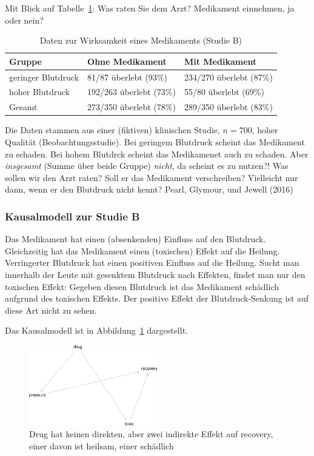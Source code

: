 \documentclass[
  a4paper,
  DIV=11]{scrreprt}
\theoremstyle{definition}
\theoremstyle{remark}
\begin{document}
Mit Blick auf Tabelle~\ref{tbl-studie-b}: Was raten Sie dem Arzt?
Medikament einnehmen, ja oder nein?

\hypertarget{tbl-studie-b}{}
\begin{longtable}{lll}
\caption{\label{tbl-studie-b}Daten zur Wirksamkeit eines Medikaments (Studie B) }\tabularnewline

\toprule
Gruppe & Ohne Medikament & Mit Medikament \\ 
\midrule
geringer Blutdruck & 81/87 überlebt (93\%) & 234/270 überlebt (87\%) \\ 
hoher Blutdruck & 192/263 überlebt (73\%) & 55/80 überlebt (69\%) \\ 
Gesamt & 273/350 überlebt (78\%) & 289/350 überlebt (83\%) \\ 
\bottomrule
\end{longtable}

Die Daten stammen aus einer (fiktiven) klinischen Studie, \(n=700\),
hoher Qualität (Beobachtungsstudie). Bei geringem Blutdruck scheint das
Medikament zu schaden. Bei hohem Blutdrck scheint das Medikamenet auch
zu schaden. Aber \emph{insgesamt} (Summe über beide Gruppe)
\emph{nicht}, da scheint es zu nutzen?! Was sollen wir den Arzt raten?
Soll er das Medikament verschreiben? Vielleicht nur dann, wenn er den
Blutdruck nicht kennt? Pearl, Glymour, und Jewell (2016)

\hypertarget{kausalmodell-zur-studie-b}{%
\subsubsection{Kausalmodell zur Studie
B}\label{kausalmodell-zur-studie-b}}

Das Medikament hat einen (absenkenden) Einfluss auf den Blutdruck.
Gleichzeitig hat das Medikament einen (toxischen) Effekt auf die
Heilung. Verringerter Blutdruck hat einen positiven Einfluss auf die
Heilung. Sucht man innerhalb der Leute mit gesenktem Blutdruck nach
Effekten, findet man nur den toxischen Effekt: Gegeben diesen Blutdruck
ist das Medikament schädlich aufgrund des toxischen Effekts. Der
positive Effekt der Blutdruck-Senkung ist auf diese Art nicht zu sehen.

Das Kausalmodell ist in Abbildung~\ref{fig-dag-studie-b} dargestellt.

\begin{figure}

{\centering \includegraphics[width=0.5\textwidth,height=\textheight]{./kausal_files/figure-pdf/fig-dag-studie-b-1.pdf}

}

\caption{\label{fig-dag-studie-b}Drug hat keinen direkten, aber zwei
indirekte Effekt auf recovery, einer davon ist heilsam, einer schädlich}

\end{figure}
\end{document}
